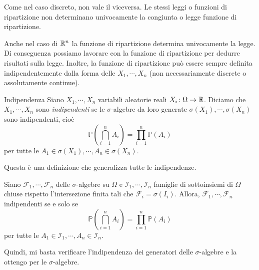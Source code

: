 \documentclass[a4paper]{article}
\begin{document}
Come nel caso discreto, non vale il viceversa.
Le stessi leggi o funzioni di ripartizione non determinano univocamente
la congiunta o legge funzione di ripartizione.

Anche nel caso di \(\mathbb{R}^n\) la funzione di ripartizione determina univocamente
la legge. Di conseguenza possiamo lavorare con la funzione di ripartizione per dedurre risultati sulla legge.
Inoltre, la funzione di ripartizione può essere sempre definita
indipendentemente dalla forma delle \(X_1, \cdots, X_n\)
(non necessariamente discrete o assolutamente continue).

\begin{snippetdefinition}{Indipendenza}
    Siano \(X_1, \cdots, X_n\) variabili aleatorie reali \(X_i \colon \Omega \to \mathbb{R}\).
    Diciamo che \(X_1, \cdots, X_n\) sono \emph{indipendenti}
    se le \(\sigma\)-algebre da loro generate
    \(\sigma(X_1), \cdots, \sigma(X_n)\) sono indipendenti, cioè
    \[
        \mathbb P\left(
            \bigcap_{i=1}^n A_i
        \right)
        = \prod_{i=1}^n \mathbb P(A_i)
    \]
    per tutte le \(A_1 \in \sigma(X_1), \cdots, A_n \in \sigma(X_n)\).
\end{snippetdefinition}

Questa è una definizione che generalizza tutte le indipendenze.

\begin{snippetproposition}{}
    Siano \(\mathcal F_1, \cdots, \mathcal F_n\)
    delle \(\sigma\)-algebre su \(\Omega\)
    e \(\mathcal I_1, \cdots, \mathcal I_n\)
    famiglie di sottoinsiemi di \(\Omega\)
    chiuse rispetto l'intersezione finita
    tali che \(\mathcal F_i = \sigma(I_i)\).
    Allora, \(\mathcal F_1, \cdots, \mathcal F_n\)
    indipendenti se e solo se \[
        \mathbb P\left(
            \bigcap_{i=1}^n A_i
        \right)
        = \prod_{i=1}^n \mathbb P(A_i)
    \]
    per tutte le \(A_1 \in \mathcal I_1, \cdots, A_n \in \mathcal I_n\).
\end{snippetproposition}

Quindi, mi basta verificare l'indipendenza dei generatori
delle \(\sigma\)-algebre e la ottengo
per le \(\sigma\)-algebre.
\end{document}
